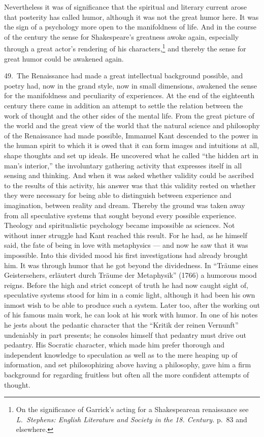 \documentclass[12pt]{book}
\newcommand{\opage}[1]{\marginnote{\footnotesize\textit{[#1]}}}
\begin{document}
Nevertheless it was of significance that the spiritual and literary current arose that posterity has
called humor, although it was \opage{160}not the great humor here. It was the sign of a psychology
more open to the manifoldness of life. And in the course of the century the sense for Shakespeare's
greatness awoke again, especially through a great actor's rendering of his characters,\footnote{On
the significance of Garrick's acting for a Shakespearean renaissance see \textit{L.~Stephens:
English Literature and Society in the 18. Century.} p.~83 and elsewhere.} and thereby the sense for
great humor could be awakened again.

49.~The Renaissance had made a great intellectual background possible, and poetry had, now in
the grand style, now in small dimensions, awakened the sense for the manifoldness and peculiarity
of experiences. At the end of the eighteenth century there came in addition an attempt to settle
the relation between the work of thought and the other sides of the mental life. From the great
picture of the world and the great view of the world that the natural science and philosophy of
the Renaissance had made possible, Immanuel Kant descended to the power in the human spirit to
which it is owed that it can form images and intuitions at all, shape thoughts and set up ideals.
He uncovered what he called ``the hidden art in man's interior,'' the involuntary gathering
activity that expresses itself in all sensing and thinking. And when it was asked whether
validity could be ascribed to the results of this activity, his answer was that this validity
rested on whether they were necessary for being able to distinguish between experience and
imagination, between reality and dream. Thereby the ground was taken away from all speculative
systems that sought beyond every possible experience. Theology and spiritualistic psychology
became impossible as sciences. Not without inner struggle had Kant reached this result. For he
had, as he himself said, the fate of being in love with metaphysics --- and now he saw that it
was impossible. Into this divided mood his first investigations had already brought him. It was
through humor that he got beyond the dividedness. In ``Träume eines Geistersehers, erläutert durch
Träume der Metaphysik'' (1766) a humorous mood reigns. Before the high and strict concept of truth
he had now caught sight of, speculative systems stood for him in a comic light, although it had
been \opage{161}his own inmost wish to be able to produce such a system. Later too, after the
working out of his famous main work, he can look at his work with humor. In one of his notes he
jests about the pedantic character that the ``Kritik der reinen Vernunft'' undeniably in part
presents; he consoles himself that pedantry must drive out pedantry. His Socratic character,
which made him prefer thorough and independent knowledge to speculation as well as to the mere
heaping up of information, and set philosophizing above having a philosophy, gave him a firm
background for regarding fruitless but often all the more confident attempts of thought.
\end{document}
